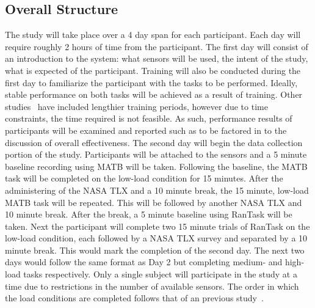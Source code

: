 \documentclass[11pt]{article}
\begin{document}
\subsection{Overall Structure}
The study will take place over a 4 day span for each participant. Each day will require roughly 2 hours of time from the participant. The first day will consist of an introduction to the system: what sensors will be used, the intent of the study, what is expected of the participant. Training will also be conducted during the first day to familiarize the participant with the tasks to be performed. Ideally, stable performance on both tasks will be achieved as a result of training. Other studies~\cite{Wilson} have included lengthier training periods, however due to time constraints, the time required is not feasible. As such, performance results of participants will be examined and reported such as to be factored in to the discussion of overall effectiveness. The second day will begin the data collection portion of the study. Participants will be attached to the sensors and a 5 minute baseline recording using MATB will be taken. Following the baseline, the MATB task will be completed on the low-load condition for 15 minutes. After the administering of the NASA TLX and a 10 minute break, the 15 minute, low-load MATB task will be repeated. This will be followed by another NASA TLX and 10 minute break. After the break, a 5 minute baseline using RanTask will be taken. Next the participant will complete two 15 minute trials of RanTask on the low-load condition, each followed by a NASA TLX survey and separated by a 10 minute break. This would mark the completion of the second day. The next two days would follow the same format as Day 2 but completing medium- and high-load tasks respectively. Only a single subject will participate in the study at a time due to restrictions in the number of available sensors. The order in which the load conditions are completed follows that of an previous study~\cite{Wilson}.
\end{document}

